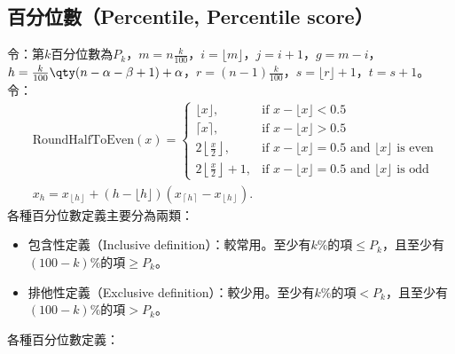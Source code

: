 \documentclass[a4paper,12pt]{report}
\begin{document}
\subsection{百分位數（Percentile, Percentile score）}
令：第$k$百分位數為$P_k$，$m=n\frac{k}{100}$，$i=\lfloor m\rfloor$，$j=i+1$，$g=m-i$，$h=\frac{k}{100}\qty(n-\alpha -\beta +1)+\alpha$，$r=(n-1)\frac{k}{100}$，$s=\lfloor r\rfloor+1$，$t=s+1$。\\
令：
\[\begin{aligned}
& \text{RoundHalfToEven}(x) = \left\{
  \begin{array}{ll}
  \lfloor x \rfloor, & \text{if\ } x - \lfloor x \rfloor < 0.5 \\
  \lceil x \rceil, & \text{if\ } x - \lfloor x \rfloor > 0.5 \\
  2\left\lfloor \frac{x}{2} \right\rfloor, & \text{if } x - \lfloor x \rfloor = 0.5 \text{\ and\ } \lfloor x \rfloor \text{\ is even} \\
  2\left\lfloor \frac{x}{2} \right\rfloor + 1, & \text{if } x - \lfloor x \rfloor = 0.5 \text{\ and\ } \lfloor x \rfloor \text{\ is odd}
  \end{array}
\right.\\
& x_h = x_{\left\lfloor h \right\rfloor} + (h-\lfloor h\rfloor)(x_{\left\lceil h \right\rceil}-x_{\left\lfloor h \right\rfloor}).
\end{aligned}\]
各種百分位數定義主要分為兩類：
\begin{itemize}
\item 包含性定義（Inclusive definition）：較常用。至少有$k$\%的項$\leq P_k$，且至少有$(100-k)\%$的項$\geq P_k$。
\item 排他性定義（Exclusive definition）：較少用。至少有$k\%$的項$<P_k$，且至少有$(100-k)\%$的項$>P_k$。
\end{itemize}
各種百分位數定義：
\end{document}
